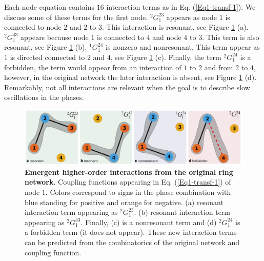 \documentclass[12pt]{article}
\theoremstyle{plain}
\theoremstyle{definition}
\theoremstyle{remark}
\theoremstyle{remark}
\begin{document}
Each node equation contains  $16$ interaction terms as in Eq. (\ref{Eq1-transf-1}).  We discuss some of these terms for the first node. $^2 G^{2 3}_1$ appears as  node $1$ is connected to node $2$ and $2$ to $3$. This interaction is resonant, see Figure \ref{Fig2} (a).  $^2 G^{4 3}_1$ appears because node $1$ is connected to $4$ and node $4$ to $3$.  This term is also resonant, see Figure \ref{Fig2} (b). $^1 G^{2 4}_1$ is nonzero and nonresonant. This term appear as $1$ is  directed connected to $2$ and $4$, see Figure \ref{Fig2} (c). Finally,  the term $^2 G^{2 4}_1$ is a forbidden, the term would appear from an interaction of $1$ to $2$ and from $2$ to $4$, however, in the original network the later interaction is absent, see Figure \ref{Fig2} (d).  Remarkably, not all interactions are relevant when the goal is to describe slow oscillations in the phases.

\begin{figure}[htp]
    \centering
    \includegraphics[width=1\columnwidth]{figure2_v5.pdf}
    \caption{{\bf Emergent higher-order interactions from the original ring network}. 
Coupling functions appearing in Eq. (\ref{Eq1-transf-1}) of node $1$.  Colors correspond to signs in the phase combination with blue standing for positive and orange for negative. (a) resonant interaction term appearing as $^2G^{2 3}_1$.  (b) resonant interaction term appearing as $^2 G^{4 3}_1$. Finally, (c) is a nonresonant term and (d) $^2 G^{2 4}_1$ is a forbidden term (it does not appear). These new interaction terms can be predicted from the combinatorics of the original network and coupling function. }
    \label{Fig2}
\end{figure}
\end{document}
